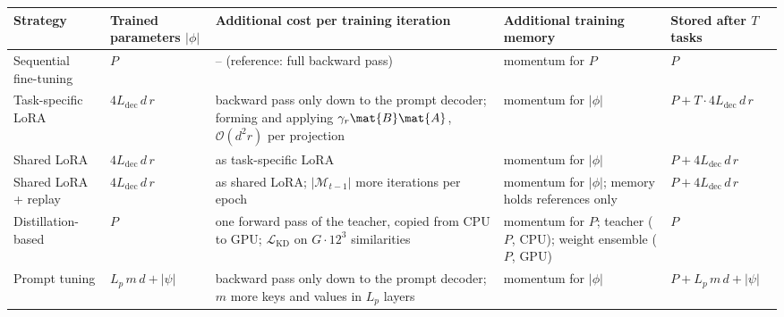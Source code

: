 \small\renewcommand{\arraystretch}{1.2}
\begin{tabularx}{\linewidth}{@{}>{\raggedright\arraybackslash}p{2.3cm}>{\raggedright\arraybackslash}p{2.4cm}>{\raggedright\arraybackslash}X>{\raggedright\arraybackslash}p{2.6cm}>{\raggedright\arraybackslash}p{2.2cm}@{}}
\toprule
Strategy & Trained parameters $|\phi|$ & Additional cost per training iteration & Additional training memory & Stored after $T$ tasks \\
\midrule
Sequential fine-tuning & $P$ & -- (reference: full backward pass) & momentum for $P$ & $P$ \\
Task-specific LoRA & $4 L_{\mathrm{dec}}\, d\, r$ & backward pass only down to the prompt decoder; forming and applying $\gamma_r\mat{B}\mat{A}$, $\mathcal{O}(d^2 r)$ per projection & momentum for $|\phi|$ & $P + T \cdot 4 L_{\mathrm{dec}}\, d\, r$ \\
Shared LoRA & $4 L_{\mathrm{dec}}\, d\, r$ & as task-specific LoRA & momentum for $|\phi|$ & $P + 4 L_{\mathrm{dec}}\, d\, r$ \\
Shared LoRA + replay & $4 L_{\mathrm{dec}}\, d\, r$ & as shared LoRA; $|\mathcal{M}_{t-1}|$ more iterations per epoch & momentum for $|\phi|$; memory holds references only & $P + 4 L_{\mathrm{dec}}\, d\, r$ \\
Distillation-based & $P$ & one forward pass of the teacher, copied from CPU to GPU; $\mathcal{L}_{\mathrm{KD}}$ on $G \cdot 12^3$ similarities & momentum for $P$; teacher ($P$, CPU); weight ensemble ($P$, GPU) & $P$ \\
Prompt tuning & $L_p\, m\, d + |\psi|$ & backward pass only down to the prompt decoder; $m$ more keys and values in $L_p$ layers & momentum for $|\phi|$ & $P + L_p\, m\, d + |\psi|$ \\
\bottomrule
\end{tabularx}
